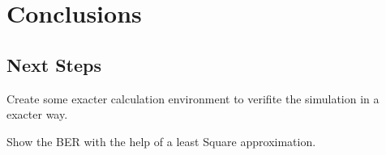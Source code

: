 
\chapter{Conclusions}


\section{Next Steps}

Create some exacter calculation environment to verifite the simulation in a exacter way.

Show the BER with the help of a least Square approximation.